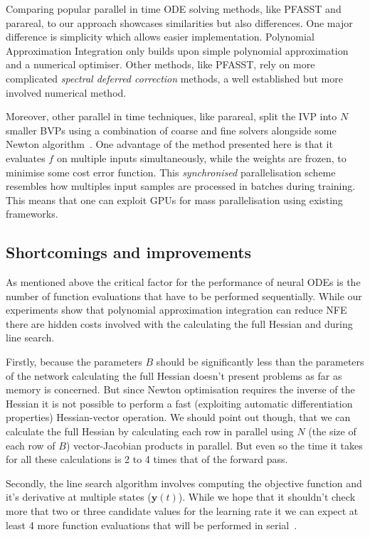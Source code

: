 \documentclass{article}
\begin{document}
    Comparing popular parallel in time ODE solving methods, like PFASST and parareal, to our approach showcases similarities but also differences.
    One major difference is simplicity which allows easier implementation.
    Polynomial Approximation Integration only builds upon simple polynomial approximation and a numerical optimiser.
    Other methods, like PFASST, rely on more complicated \textit{spectral deferred correction} methods, a well established but more involved numerical method.

    Moreover, other parallel in time techniques, like parareal, split the IVP into $N$ smaller BVPs using a combination of coarse and fine solvers alongside some Newton algorithm~\cite{maday2002parareal}.
    One advantage of the method presented here is that it evaluates $f$ on multiple inputs simultaneously, while the weights are frozen, to minimise some cost error function.
    This \textit{synchronised}  parallelisation scheme resembles how multiples input samples are processed in batches during training.
    This means that one can exploit GPUs for mass parallelisation using existing frameworks.

    \subsection{Shortcomings and improvements}
    As mentioned above the critical factor for the performance of neural ODEs is the number of function evaluations that have to be performed sequentially.
    While our experiments show that polynomial approximation integration can reduce NFE there are hidden costs involved with the calculating the full Hessian and during line search.

    Firstly, because the parameters $B$ should be significantly less than the parameters of the network calculating the full Hessian doesn't present problems as far as memory is concerned.
    But since Newton optimisation requires the inverse of the Hessian it is not possible to perform a fast (exploiting automatic differentiation properties) Hessian-vector operation.
    We should point out though, that we can calculate the full Hessian by calculating each row in parallel using $N$ (the size of each row of $B$) vector-Jacobian products in parallel.
    But even so the time it takes for all these calculations is 2 to 4 times that of the forward pass.

    Secondly, the line search algorithm involves computing the objective function and it's derivative at multiple states ($\pmb{y}(t)$). While we hope that it shouldn't check more that two or three candidate values for the learning rate it we can expect at least 4 more function evaluations that will be performed in serial~\cite{wright2006numerical}.
\end{document}
